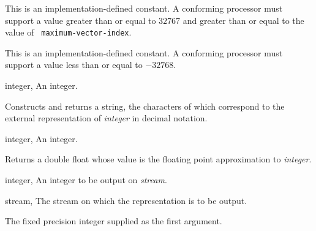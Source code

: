 \begin{optDefinition}

\remarks%
This is an implementation-defined constant.  A conforming processor
must support a value greater than or equal to $32767$ and greater than
or equal to the value of {\tt
maximum-vector-index}.


\remarks%
This is an implementation-defined constant.  A conforming processor
must support a value less than or equal to
$-32768$.

%
\begin{specargs}
    \item[integer, \classref{fixed-precision-integer}] An integer.
\end{specargs}
%
\result%
Constructs and returns a string, the characters of which correspond to
the external representation of {\em integer\/} in decimal notation.

\begin{specargs}
\item[integer, \classref{fixed-precision-integer}] An integer.
\end{specargs}

\result%
Returns a double float whose value is the floating point approximation
to {\em integer}.

\begin{specargs}
\item[integer, \classref{fixed-precision-integer}] An integer to be output on {\em stream}.
\item[stream, \classref{stream}] The stream on which the representation is
to be output.
\end{specargs}

\result%
The fixed precision integer supplied as the first argument.


\end{optDefinition}
